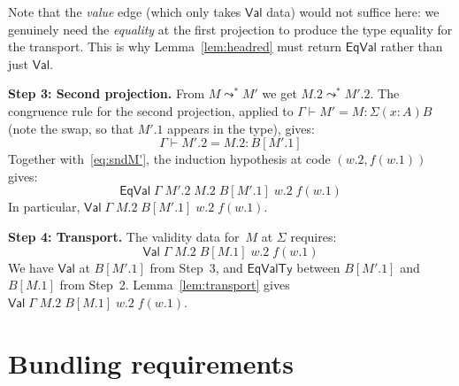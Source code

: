 \documentclass[11pt]{article}
\newcommand{\conveq}[4]{#1 \vdash #2 = #3 : #4}
\newcommand{\substone}[2]{#1[#2]}
\newcommand{\Red}{\mathrel{\leadsto^*}}
\newcommand{\Sigmatype}[2]{\Sigma(#1)#2}
\newcommand{\Val}{\mathsf{Val}}
\newcommand{\EqVal}{\mathsf{EqVal}}
\newcommand{\EqValTy}{\mathsf{EqValTy}}
\newcommand{\pj}[2]{#1\mbox{.}#2}
\begin{document}
Note that the \emph{value} edge (which only takes $\Val$ data) would not suffice
here: we genuinely need the \emph{equality} at the first projection to produce
the type equality for the transport.  This is why
Lemma~\ref{lem:headred} must return $\EqVal$ rather than just $\Val$.

\medskip
\noindent\textbf{Step 3: Second projection.}
From $M \Red M'$ we get $\pj{M}{2} \Red \pj{M'}{2}$.  The congruence
rule for the second projection, applied to
$\conveq{\Gamma}{M'}{M}{\Sigmatype{x{:}A}{B}}$
(note the swap, so that $\pj{M'}{1}$ appears in the type), gives:
\[
  \conveq{\Gamma}{\pj{M'}{2}}{\pj{M}{2}}{\substone{B}{\pj{M'}{1}}}
\]
Together with~\eqref{eq:sndM'}, the induction hypothesis at code
$(\pj{w}{2}, f(\pj{w}{1}))$ gives:
\begin{equation}\label{eq:eqsnd}
  \EqVal\;\Gamma\;\pj{M'}{2}\;\pj{M}{2}\;\substone{B}{\pj{M'}{1}}\;\pj{w}{2}\;f(\pj{w}{1})
\end{equation}
In particular, $\Val\;\Gamma\;\pj{M}{2}\;\substone{B}{\pj{M'}{1}}\;\pj{w}{2}\;f(\pj{w}{1})$.

\medskip
\noindent\textbf{Step 4: Transport.}
The validity data for~$M$ at $\Sigma$ requires:
\[
  \Val\;\Gamma\;\pj{M}{2}\;\substone{B}{\pj{M}{1}}\;\pj{w}{2}\;f(\pj{w}{1})
\]
We have $\Val$ at $\substone{B}{\pj{M'}{1}}$ from Step~3, and $\EqValTy$ between
$\substone{B}{\pj{M'}{1}}$ and $\substone{B}{\pj{M}{1}}$ from Step~2.
Lemma~\ref{lem:transport} gives
$\Val\;\Gamma\;\pj{M}{2}\;\substone{B}{\pj{M}{1}}\;\pj{w}{2}\;f(\pj{w}{1})$.

\section{Bundling requirements}
\end{document}
